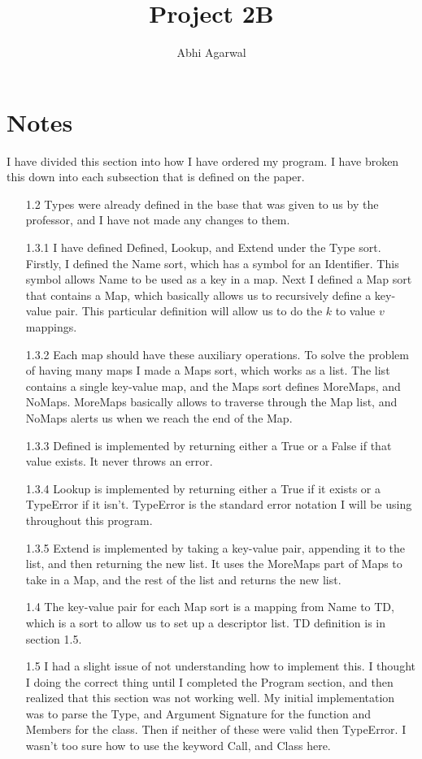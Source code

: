 \documentclass[11pt, oneside]{article}
\title{Project 2B}
\author{Abhi Agarwal}
\date{}
\begin{document}
\maketitle
\section*{Notes}
\par I have divided this section into how I have ordered my program. I have broken this down into each subsection that is defined on the paper.
\begin{enumerate}
\item[1.2] Types were already defined in the base that was given to us by the professor, and I have not made any changes to them.
\item[1.3.1] I have defined Defined, Lookup, and Extend under the Type sort. Firstly, I defined the Name sort, which has a symbol for an Identifier. This symbol allows Name to be used as a key in a map. Next I defined a Map sort that contains a Map, which basically allows us to recursively define a key-value pair. This particular definition will allow us to do the $k$ to value $v$ mappings.
\item[1.3.2] Each map should have these auxiliary operations. To solve the problem of having many maps I made a Maps sort, which works as a list. The list contains a single key-value map, and the Maps sort defines MoreMaps, and NoMaps. MoreMaps basically allows to traverse through the Map list, and NoMaps alerts us when we reach the end of the Map.
\item[1.3.3] Defined is implemented by returning either a True or a False if that value exists. It never throws an error.
\item[1.3.4] Lookup is implemented by returning either a True if it exists or a TypeError if it isn't. TypeError is the standard error notation I will be using throughout this program.
\item[1.3.5] Extend is implemented by taking a key-value pair, appending it to the list, and then returning the new list. It uses the MoreMaps part of Maps to take in a Map, and the rest of the list and returns the new list.
\item[1.4] The key-value pair for each Map sort is a mapping from Name to TD, which is a sort to allow us to set up a descriptor list. TD definition is in section 1.5.
\item[1.5] I had a slight issue of not understanding how to implement this. I thought I doing the correct thing until I completed the Program section, and then realized that this section was not working well. My initial implementation was to parse the Type, and Argument Signature for the function and Members for the class. Then if neither of these were valid then TypeError. I wasn't too sure how to use the keyword Call, and Class here. 

\end{enumerate}
\end{document}
